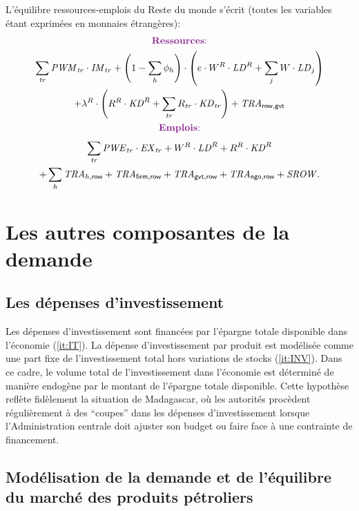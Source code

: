 \documentclass[11pt,a4paper]{article}
\newcommand{\gvt}{\mathsf{gvt}}
\newcommand{\firm}{\mathsf{firm}}
\newcommand{\ngo}{\mathsf{ngo}}
\newcommand{\row}{\mathsf{row}}
\newcommand{\EX}{\mathit{EX}}
\newcommand{\IM}{\mathit{IM}}
\newcommand{\KD}{\mathit{KD}}
\newcommand{\LD}{\mathit{LD}}
\newcommand{\PWE}{\mathit{PWE}}
\newcommand{\PWM}{\mathit{PWM}}
\newcommand{\TR}{\mathit{TRA}}
\newcommand{\tr}{\mathit{tr}}
\newcommand{\SROW}{\mathit{SROW}}
\begin{document}
	L'équilibre ressources-emplois du Reste du monde s'écrit (toutes les variables étant exprimées en monnaies étrangères):
	\begin{gather}
		\centerline{\textcolor{Fuchsia}{\textbf{Ressources}:}} \notag\\
		\sum_{\tr}^{} \PWM_{\tr}\cdot\IM_{tr} + \left(1 -\sum_{h}\phi_h\right) \cdot\left(e\cdot W^R\cdot\LD^R + \sum_{j}^{} W\cdot\LD_{j}\right) \notag\\
		+ \lambda^R \cdot\left(R^R\cdot\KD^R + \sum_{\tr}^{} R_{\tr}\cdot\KD_{\tr}\right) + \TR_{\row,\gvt}\notag\\
		\centerline{\textcolor{Fuchsia}{\textbf{Emplois}:}} \notag\\
		\sum_{\tr}^{} \PWE_{\tr}\cdot\EX_{\tr}  +  W^R\cdot\LD^R +  R^R\cdot\KD^R\notag\\
		+ \sum_{h}\TR_{h,\row} + \TR_{\firm,\row} + \TR_{\gvt,\row} + \TR_{\ngo,\row} + \SROW. \notag
	\end{gather}
	
	
	
	\section{Les autres composantes de la demande}
	\subsection{Les dépenses d'investissement}
	Les dépenses d'investissement sont financées par l'épargne totale disponible dans l'économie (\ref{it:IT}). La dépense d'investissement par produit est modélisée comme une part fixe de l'investissement total hors variations de stocks (\ref{it:INV}). Dans ce cadre, le volume total de l'investissement dans l'économie est déterminé de manière endogène par le montant de l'épargne totale disponible. Cette hypothèse reflète fidèlement la situation de Madagascar, où les autorités procèdent régulièrement à des ``coupes'' dans les dépenses d'investissement lorsque l'Administration centrale doit ajuster son budget ou faire face à une contrainte de financement.
	
	\subsection{Modélisation de la demande et de l'équilibre du marché des produits pétroliers}
	
\end{document}
